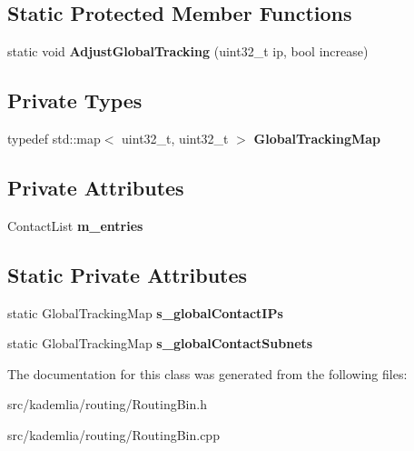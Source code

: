 \subsection*{Static Protected Member Functions}
\begin{DoxyCompactItemize}
\item 
static void {\bfseries AdjustGlobalTracking} (uint32\_\-t ip, bool increase)\label{classKademlia_1_1CRoutingBin_a76373a81d64dda5e83892c64f69613c2}

\end{DoxyCompactItemize}
\subsection*{Private Types}
\begin{DoxyCompactItemize}
\item 
typedef std::map$<$ uint32\_\-t, uint32\_\-t $>$ {\bfseries GlobalTrackingMap}\label{classKademlia_1_1CRoutingBin_a03643deea7404e254b6b9f962765f410}

\end{DoxyCompactItemize}
\subsection*{Private Attributes}
\begin{DoxyCompactItemize}
\item 
ContactList {\bfseries m\_\-entries}\label{classKademlia_1_1CRoutingBin_a4a812e1ce1a20f4c113e473e9383892d}

\end{DoxyCompactItemize}
\subsection*{Static Private Attributes}
\begin{DoxyCompactItemize}
\item 
static GlobalTrackingMap {\bfseries s\_\-globalContactIPs}\label{classKademlia_1_1CRoutingBin_ab51c8ce3d3afa63ea8bd8261f36fe744}

\item 
static GlobalTrackingMap {\bfseries s\_\-globalContactSubnets}\label{classKademlia_1_1CRoutingBin_a23f700436922e5030771139e17833e5c}

\end{DoxyCompactItemize}


The documentation for this class was generated from the following files:\begin{DoxyCompactItemize}
\item 
src/kademlia/routing/RoutingBin.h\item 
src/kademlia/routing/RoutingBin.cpp\end{DoxyCompactItemize}
